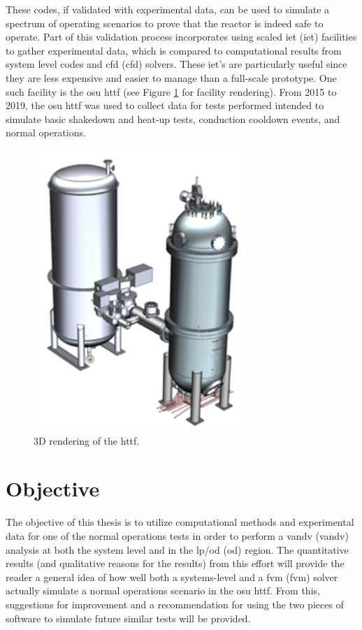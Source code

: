 \documentclass[double,12pt]{beavtex}
\begin{document}
These codes, if validated with experimental data, can be used to simulate a spectrum of operating scenarios to prove that the reactor is indeed safe to operate. Part of this validation process incorporates using scaled \acrlong{iet} (\acrshort{iet}) facilities to gather experimental data, which is compared to computational results from system level codes and \acrlong{cfd} (\acrshort{cfd}) solvers. These \acrshort{iet}'s are particularly useful since they are less expensive and easier to manage than a full-scale prototype. One such facility is the \acrshort{osu} \acrshort{httf} (see Figure \ref{fig:HTTF_Shell} for facility rendering). From 2015 to 2019, the \acrshort{osu} \acrshort{httf} was used to collect data for tests performed intended to simulate basic shakedown and heat-up tests, conduction cooldown events, and normal operations. 

\begin{figure}
    \begin{center}
    	\includegraphics[width=8cm]{Figures/HTTF_Shell}
    	\caption{3D rendering of the \acrshort{httf}.}
    	\label{fig:HTTF_Shell}
    	\end{center}
\end{figure}

\section{Objective}

The objective of this thesis is to utilize computational methods and experimental data for one of the normal operations tests in order to perform a \acrlong{vandv} (\acrshort{vandv}) analysis at both the system level and in the \acrshort{lp}/\acrlong{od} (\acrshort{od}) region. The quantitative results (and qualitative reasons for the results) from this effort will provide the reader a general idea of how well both a systems-level and a \acrlong{fvm} (\acrshort{fvm}) solver actually simulate a normal operations scenario in the \acrshort{osu} \acrshort{httf}. From this, suggestions for improvement and a recommendation for using the two pieces of software to simulate future similar tests will be provided.
\end{document}

